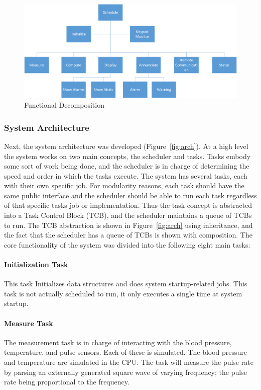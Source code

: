 \documentclass[12pt]{article} %
\begin{document}
    \begin{figure}[h]
      \centering
      \includegraphics[width=\textwidth]{../design/Functional_decomposition}
      \caption{Functional Decomposition}
      \label{fig:func}
    \end{figure}

    \subsubsection{System Architecture}
    Next, the system architecture was developed (Figure~\ref{fig:arch}). At a high
    level the system works on two main concepts, the scheduler and tasks. Tasks
    embody some sort of work being done, and the scheduler is in charge of
    determining the speed and order in which the tasks execute. The system has
    several tasks, each with their own specific job. For modularity reasons, each
    task should have the same public interface and the scheduler should be able to
    run each task regardless of that specific tasks job or implementation. Thus
    the task concept is abstracted into a Task Control Block (TCB), and the
    scheduler maintains a queue of TCBs to run. The TCB abstraction is shown in
    Figure~\ref{fig:arch} using inheritance, and the fact that the scheduler has a
    queue of TCBs is shown with composition. The core functionality of the system
    was divided into the following eight main tasks:

    \paragraph{Initialization Task} This task Initializes data structures and does
    system startup-related jobs. This task is not actually scheduled to run, it
    only executes a single time at system startup.

    \paragraph{Measure Task} The measurement task is in charge of interacting with
    the blood pressure, temperature, and pulse sensors. Each of these is
    simulated. The blood pressure and temperature are simulated in the CPU. The
    task will measure the pulse rate by parsing an externally generated square wave
    of varying frequency; the pulse rate being proportional to the frequency.
\end{document}
